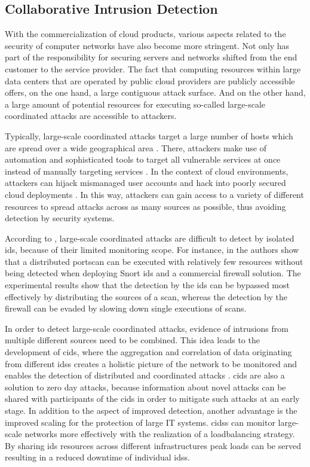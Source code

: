 \subsection{Collaborative Intrusion Detection}\label{subsec:cids}
With the commercialization of cloud products, various aspects related to the security of computer networks have also become more stringent. Not only has part of the responsibility for securing servers and networks shifted from the end customer to the service provider. The fact that computing resources within large data centers that are operated by public cloud providers are publicly accessible offers, on the one hand, a large contiguous attack surface. And on the other hand, a large amount of potential resources for executing so-called large-scale coordinated attacks are accessible to attackers. 

Typically, large-scale coordinated attacks target a large number of hosts which are spread over a wide geographical area \cite{Zhou2010}.
There, attackers make use of automation and sophisticated tools to target all vulnerable services at once instead of manually targeting services \cite{savage2005}. In the context of cloud environments, attackers can hijack mismanaged user accounts and hack into poorly secured cloud deployments \cite{kumar2019}. In this way, attackers can gain access to a variety of different resources to spread attacks across as many sources as possible, thus avoiding detection by security systems.

According to \cite{Zhou2010}, large-scale coordinated attacks are difficult to detect by isolated \gls{ids}, because of their limited monitoring scope. For instance, in \cite{riquet2012large} the authors show that a distributed portscan can be executed with relatively few resources without being detected when deploying Snort \gls{ids} and a commercial firewall solution. The experimental results show that the detection by the \gls{ids} can be bypassed most effectively by distributing the sources of a scan, whereas the detection by the firewall can be evaded by slowing down single executions of scans. 

In order to detect large-scale coordinated attacks, evidence of intrusions from multiple different sources need to be combined. This idea leads to the development of \gls{cids}, where the aggregation and correlation of data originating from different \glspl{ids} creates a holistic picture of the network to be monitored and enables the detection of distributed and coordinated attacks \cite[24]{vasilomanolakis_collaborative_2016}. \gls{cids} are also a solution to zero day attacks, because information about novel attacks can be shared with participants of the \gls{cids} in order to mitigate such attacks at an early stage. In addition to the aspect of improved detection, another advantage is the improved scaling for the protection of large IT systems. \glspl{cids} can monitor large-scale networks more effectively with the realization of a loadbalancing strategy. By sharing \gls{ids} resources across different infrastructures peak loads can be served resulting in a reduced downtime of individual \glspl{ids}.

